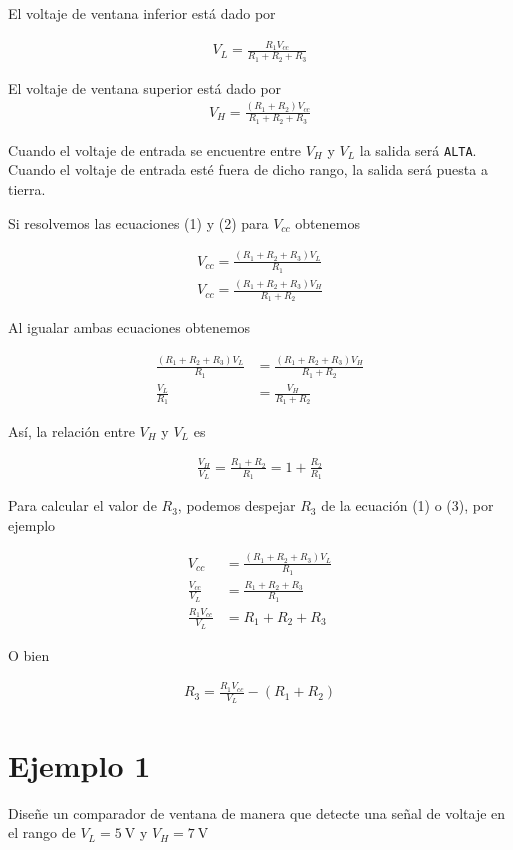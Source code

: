 \documentclass{article}
\begin{document}
El voltaje de ventana inferior está dado por

\begin{align}
	V_L = \frac{R_1 V_{cc}}{R_1 + R_2 + R_3}
\end{align}

El voltaje de ventana superior está dado por
\begin{align}
	V_H = \frac{(R_1 + R_2) V_{cc}}{R_1 + R_2 + R_3}
\end{align}

Cuando el voltaje de entrada se encuentre entre $V_H$ y $V_L$ la salida será \texttt{ALTA}. Cuando el voltaje de entrada esté fuera de dicho rango, la salida será puesta a tierra.


Si resolvemos las ecuaciones (1) y (2) para $V_{cc}$ obtenemos

\begin{align}
	V_{cc} = \frac{(R_1 +R_2 + R_3)V_L}{R_1} \\
	V_{cc} = \frac{(R_1 +R_2 + R_3)V_H}{R_1 + R_2} 
\end{align}

Al igualar ambas ecuaciones obtenemos

\begin{align}
	\frac{(R_1 +R_2 + R_3)V_L}{R_1} &= \frac{(R_1 +R_2 + R_3)V_H}{R_1 + R_2}  \\
	\frac{V_L}{R_1} &= \frac{V_H}{R_1 + R_2}
\end{align}

Así, la relación entre $V_H$ y $V_L$ es

\begin{align}
	\frac{V_H}{V_L} = \frac{R_1 + R_2}{R_1} = 1 + \frac{R_2}{R_1}
\end{align}

Para calcular el valor de $R_3$, podemos despejar $R_3$ de la ecuación (1) o (3), por ejemplo

\begin{align}
	V_{cc} &= \frac{(R_1 +R_2 + R_3)V_L}{R_1} \nonumber \\
	\frac{V_{cc}}{V_L} &= \frac{R_1 +R_2 + R_3}{R_1} \nonumber \\
	\frac{R_1V_{cc}}{V_L} &= R_1 + R_2 + R_3 \nonumber
\end{align}

O bien

\begin{align}
	R_3 = \frac{R_1V_{cc}}{V_L} - (R_1 + R_2)
\end{align}

\section*{Ejemplo 1}
Diseñe un comparador de ventana de manera que detecte una señal de voltaje en el rango de $V_L=\qty{5}{\volt}$ y $V_H=\qty{7}{\volt}$ \\
\end{document}
